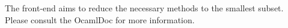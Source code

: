 The front-end aims to reduce the necessary methods to the smallest subset.
Please consult the OcamlDoc for more information.
